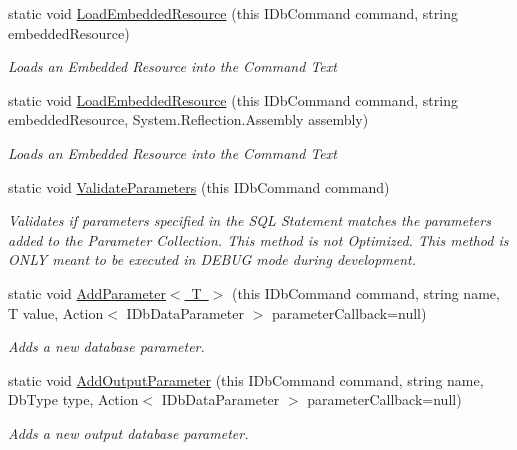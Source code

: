 \begin{DoxyCompactItemize}
\item 
static void \mbox{\hyperlink{class_blue_cloud_1_1_extensions_1_1_data_1_1_i_db_command_extensions_ade7a7c7734eb0342da8adab3fd64e1db}{Load\+Embedded\+Resource}} (this I\+Db\+Command command, string embedded\+Resource)
\begin{DoxyCompactList}\small\item\em Loads an Embedded Resource into the Command Text \end{DoxyCompactList}\item 
static void \mbox{\hyperlink{class_blue_cloud_1_1_extensions_1_1_data_1_1_i_db_command_extensions_aab4280488db21f8215f49ca35a1f8721}{Load\+Embedded\+Resource}} (this I\+Db\+Command command, string embedded\+Resource, System.\+Reflection.\+Assembly assembly)
\begin{DoxyCompactList}\small\item\em Loads an Embedded Resource into the Command Text \end{DoxyCompactList}\item 
static void \mbox{\hyperlink{class_blue_cloud_1_1_extensions_1_1_data_1_1_i_db_command_extensions_a823e1e5bb08e6a7970e88c262b0d8945}{Validate\+Parameters}} (this I\+Db\+Command command)
\begin{DoxyCompactList}\small\item\em Validates if parameters specified in the S\+QL Statement matches the parameters added to the Parameter Collection. This method is not Optimized. This method is O\+N\+LY meant to be executed in D\+E\+B\+UG mode during development. \end{DoxyCompactList}\item 
static void \mbox{\hyperlink{class_blue_cloud_1_1_extensions_1_1_data_1_1_i_db_command_extensions_af870b6bc8fd4669588dc5cccce54c89e}{Add\+Parameter$<$ T $>$}} (this I\+Db\+Command command, string name, T value, Action$<$ I\+Db\+Data\+Parameter $>$ parameter\+Callback=null)
\begin{DoxyCompactList}\small\item\em Adds a new database parameter. \end{DoxyCompactList}\item 
static void \mbox{\hyperlink{class_blue_cloud_1_1_extensions_1_1_data_1_1_i_db_command_extensions_ab164a63709c4d2e66f95b8b993edaf40}{Add\+Output\+Parameter}} (this I\+Db\+Command command, string name, Db\+Type type, Action$<$ I\+Db\+Data\+Parameter $>$ parameter\+Callback=null)
\begin{DoxyCompactList}\small\item\em Adds a new output database parameter. \end{DoxyCompactList}\item 

\end{DoxyCompactItemize}
